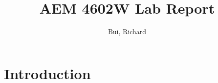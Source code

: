 \documentclass{AEM4602Wreport}
\title{AEM 4602W Lab Report} %
\author[1]{Bui, Richard}
\affil[1]{Department of Aerospace Engineering \& Mechanics, University of Minnesota} %
\begin{document}
\maketitle

\begin{abstract}

\end{abstract}

\section{Introduction}





\begin{appendix}


\end{appendix}


\end{document}
